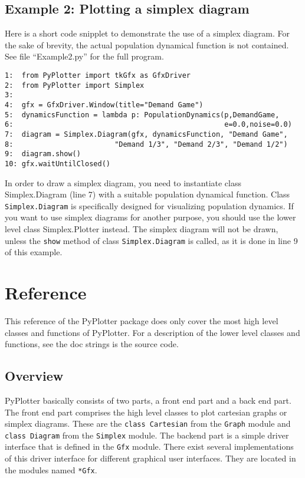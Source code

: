 \documentclass[12pt,a4paper,USenglish]{article}
\begin{document}
\subsection{Example 2: Plotting a simplex diagram}

Here is a short code snipplet to demonstrate the use of a simplex diagram.
For the sake of brevity, the actual population dynamical function is
not contained. See file ``Example2.py'' for the full program.

\begin{verbatim}
1:  from PyPlotter import tkGfx as GfxDriver
2:  from PyPlotter import Simplex
3:
4:  gfx = GfxDriver.Window(title="Demand Game")   
5:  dynamicsFunction = lambda p: PopulationDynamics(p,DemandGame, 
6:                                                  e=0.0,noise=0.0)
7:  diagram = Simplex.Diagram(gfx, dynamicsFunction, "Demand Game",
8:                        "Demand 1/3", "Demand 2/3", "Demand 1/2")
9:  diagram.show()
10: gfx.waitUntilClosed()
\end{verbatim}

In order to draw a simplex diagram, you need to instantiate class
Simplex.Diagram (line 7) with a suitable population dynamical
function. Class {\tt Simplex.Diagram} is specifically designed for
visualizing population dynamics. If you want to use simplex diagrams
for another purpose, you should use the lower level class
Simplex.Plotter instead. The simplex diagram will not be drawn, unless
the {\tt show} method of class {\tt Simplex.Diagram} is called, as it
is done in line 9 of this example.

\section{Reference}

This reference of the {\sf PyPlotter} package does only cover the most high
level classes and functions of {\sf PyPlotter}. For a description of the
lower level classes and functions, see the doc strings is the source
code.

\subsection{Overview}

{\sf PyPlotter} basically consists of two parts, a front end part and
a back end part. The front end part comprises the high level classes
to plot cartesian graphs or simplex diagrams. These are the {\tt class
Cartesian} from the {\tt Graph} module and {\tt class Diagram} from
the {\tt Simplex} module. The backend part is a simple driver
interface that is defined in the {\tt Gfx} module. There exist several
implementations of this driver interface for different graphical user
interfaces. They are located in the modules named {\tt **Gfx}.
\end{document}
